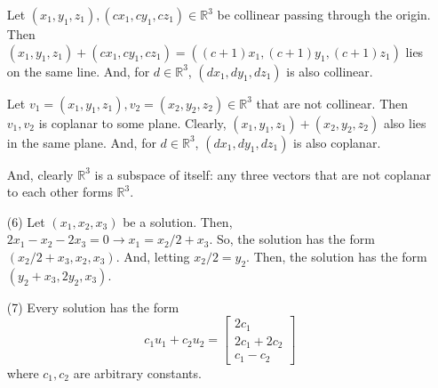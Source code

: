 \documentclass[12pt]{article}
\begin{document}
\begin{itemize}
Let $(x_1, y_1, z_1), (cx_1, cy_1, cz_1) \in \mathbb{R}^3$ be collinear passing through the origin. Then $(x_1, y_1, z_1) + (cx_1, cy_1, cz_1) = ((c + 1)x_1, (c + 1)y_1, (c + 1)z_1)$ lies on the same line. And, for $d \in \mathbb{R}^3$, $(dx_1, dy_1, dz_1)$ is also collinear.

Let $v_1 = (x_1, y_1, z_1), v_2 = (x_2, y_2, z_2) \in \mathbb{R}^3$ that are not collinear. Then $v_1, v_2$ is coplanar to some plane. Clearly, $(x_1, y_1, z_1) + (x_2, y_2, z_2)$ also lies in the same plane. And, for $d \in \mathbb{R}^3$, $(dx_1, dy_1, dz_1)$ is also coplanar.

And, clearly $\mathbb{R}^3$ is a subspace of itself: any three vectors that are not coplanar to each other forms $\mathbb{R}^3$.
\item[(6)]
Let $(x_1, x_2, x_3)$ be a solution. Then, $2x_1 - x_2 - 2x_3 = 0 \rightarrow x_1 = x_2/2 + x_3$. So, the solution has the form $(x_2/2 + x_3, x_2, x_3)$. And, letting $x_2/2 = y_2$. Then, the solution has the form $(y_2 + x_3, 2y_2, x_3)$.
\item[(7)]
Every solution has the form
$$c_1u_1 + c_2u_2 = \begin{bmatrix}
2c_1 \\
2c_1 + 2c_2 \\
c_1 - c_2
\end{bmatrix}$$
where $c_1, c_2$ are arbitrary constants.
\end{itemize}
\end{document}
